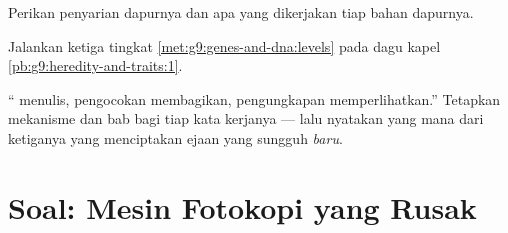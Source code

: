 \begin{exercise}[$\star\star$]\label{exo:g9:genes-and-dna:10}
Perikan penyarian dapurnya dan apa yang dikerjakan tiap
bahan dapurnya.
\end{exercise}

\begin{exercise}[$\star\star$]\label{exo:g9:genes-and-dna:11}
Jalankan ketiga tingkat \cref{met:g9:genes-and-dna:levels}
pada dagu kapel \cref{pb:g9:heredity-and-traits:1}.
\end{exercise}

\begin{exercise}[$\star\star\star$]\label{exo:g9:genes-and-dna:12}
`` menulis, pengocokan membagikan, pengungkapan
memperlihatkan.'' Tetapkan mekanisme dan bab bagi tiap kata
kerjanya --- lalu nyatakan yang mana dari ketiganya yang
menciptakan ejaan yang sungguh \emph{baru}.
\end{exercise}

\section{Soal: Mesin Fotokopi yang Rusak}

